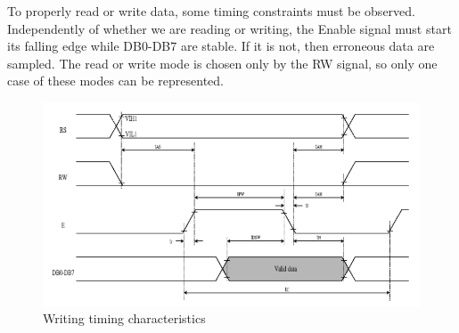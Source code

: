 \documentclass[a4paper, 12pt]{article}
\begin{document}
To properly read or write data, some timing constraints must be observed. \\
Independently of whether we are reading or writing, the Enable signal must start its falling edge while DB$0$-DB$7$ are stable. If it is not, then erroneous data are sampled. 
The read or write mode is chosen only by the RW signal, so only one case of these modes can be represented.
\begin{figure}[h]
    \includegraphics[width=12cm]{lcd_writing_data}
    \centering
    \caption{Writing timing characteristics}
\end{figure}
\end{document}

